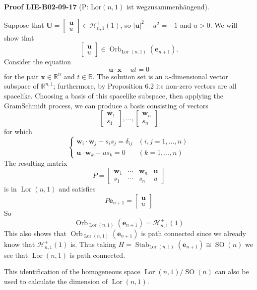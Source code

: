 \documentclass[10pt, letterpaper]{article}
\newcommand{\CustomHeading}[3]{%
  \par\medskip\noindent%
  \textbf{#1 #2} \textnormal{(#3)}.\enskip%
}
\newenvironment{PROOF}[2]{\begin{unitbox}\CustomHeading{Proof}{#1}{#2}}{\end{unitbox}}
\begin{document}
\begin{PROOF}{LIE-B02-09-17}{P: $\mathrm{Lor}(n,1)$ ist wegzusammenhängend}
Suppose that $\mathbf{U}=\left[\begin{array}{l}\mathbf{u} \\ u\end{array}\right] \in \mathcal{H}_{n, 1}^{+}(1)$, so $|\mathbf{u}|^{2}-u^{2}=-1$ and $u>0$. We will show that
$$
\left[\begin{array}{l}
\mathbf{u} \\
u
\end{array}\right] \in \operatorname{Orb}_{\text {Lor }(n, 1)}\left(\mathbf{e}_{n+1}\right) .
$$
Consider the equation
$$
\mathbf{u} \cdot \mathbf{x}-u t=0
$$
for the pair $\mathbf{x} \in \mathbb{R}^{n}$ and $t \in \mathbb{R}$. The solution set is an $n$-dimensional vector subspace of $\mathbb{R}^{n, 1}$; furthermore, by Proposition 6.2 its non-zero vectors are all spacelike. Choosing a basis of this spacelike subspace, then applying the GramSchmidt process, we can produce a basis consisting of vectors
$$
\left[\begin{array}{c}
\mathbf{w}_{1} \\
s_{1}
\end{array}\right], \ldots,\left[\begin{array}{c}
\mathbf{w}_{n} \\
s_{n}
\end{array}\right]
$$
for which
$$
\begin{cases}\mathbf{w}_{i} \cdot \mathbf{w}_{j}-s_{i} s_{j}=\delta_{i j} & (i, j=1, \ldots, n) \\ \mathbf{u} \cdot \mathbf{w}_{k}-u s_{k}=0 & (k=1, \ldots, n)\end{cases}
$$
The resulting matrix
$$
P=\left[\begin{array}{cccc}
\mathbf{w}_{1} & \cdots & \mathbf{w}_{n} & \mathbf{u} \\
s_{1} & \cdots & s_{n} & u
\end{array}\right]
$$
is in $\operatorname{Lor}(n, 1)$ and satisfies
$$
P \mathbf{e}_{n+1}=\left[\begin{array}{l}
\mathbf{u} \\
u
\end{array}\right]
$$
So
$$
\operatorname{Orb}_{\operatorname{Lor}(n, 1)}\left(\mathbf{e}_{n+1}\right)=\mathcal{H}_{n, 1}^{+}(1)
$$
This also shows that $\operatorname{Orb}_{\operatorname{Lor}(n, 1)}\left(\mathbf{e}_{n+1}\right)$ is path connected since we already know that $\mathcal{H}_{n, 1}^{+}(1)$ is. Thus taking $H=\operatorname{Stab}_{\text {Lor }(n, 1)}\left(\mathbf{e}_{n+1}\right) \cong \operatorname{SO}(n)$ we see that $\operatorname{Lor}(n, 1)$ is path connected.

This identification of the homogeneous space $\operatorname{Lor}(n, 1) / \operatorname{SO}(n)$ can also be used to calculate the dimension of $\operatorname{Lor}(n, 1)$.
\end{PROOF}
\end{document}
